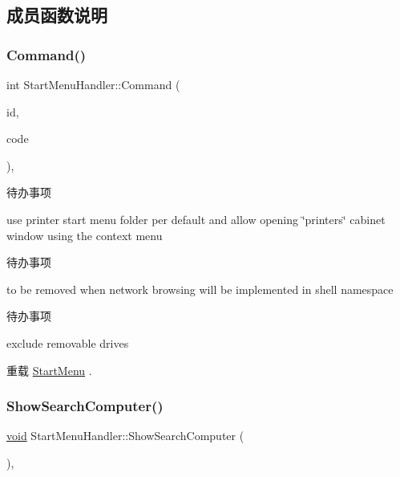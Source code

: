 \subsection{成员函数说明}
\mbox{\label{struct_start_menu_handler_acf21227ba5f3d16659873efd2630a200}} 
\subsubsection{\texorpdfstring{Command()}{Command()}}
{\footnotesize\ttfamily int Start\+Menu\+Handler\+::\+Command (\begin{DoxyParamCaption}\item[{int}]{id,  }\item[{int}]{code }\end{DoxyParamCaption})\hspace{0.3cm}{\ttfamily [protected]}, {\ttfamily [virtual]}}

\begin{DoxyRefDesc}{待办事项}
\item[\hyperlink{todo__todo000066}{待办事项}]use printer start menu folder per default and allow opening \char`\"{}printers\char`\"{} cabinet window using the context menu \end{DoxyRefDesc}


\begin{DoxyRefDesc}{待办事项}
\item[\hyperlink{todo__todo000067}{待办事项}]to be removed when network browsing will be implemented in shell namespace \end{DoxyRefDesc}


\begin{DoxyRefDesc}{待办事项}
\item[\hyperlink{todo__todo000068}{待办事项}]exclude removable drives \end{DoxyRefDesc}


重载 \hyperlink{struct_start_menu}{Start\+Menu} .

\mbox{\label{struct_start_menu_handler_a7ebc2b808763f6ad884ad8d5b03b6069}} 
\subsubsection{\texorpdfstring{Show\+Search\+Computer()}{ShowSearchComputer()}}
{\footnotesize\ttfamily \hyperlink{interfacevoid}{void} Start\+Menu\+Handler\+::\+Show\+Search\+Computer (\begin{DoxyParamCaption}{ }\end{DoxyParamCaption})\hspace{0.3cm}{\ttfamily [static]}, {\ttfamily [protected]}}

